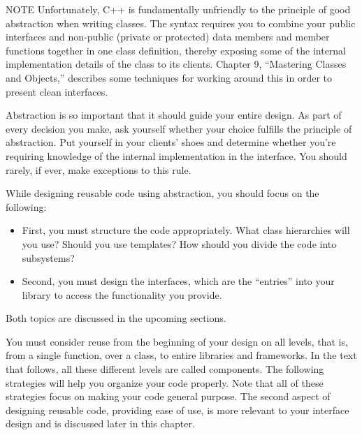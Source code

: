 \begin{myNotic}{NOTE}
Unfortunately, C++ is fundamentally unfriendly to the principle of good abstraction when writing classes. The syntax requires you to combine your public interfaces and non-public (private or protected) data members and member functions together in one class definition, thereby exposing some of the internal implementation details of the class to its clients. Chapter 9, “Mastering Classes and Objects,” describes some techniques for working around this in order to present clean interfaces.
\end{myNotic}

Abstraction is so important that it should guide your entire design. As part of every decision you make, ask yourself whether your choice fulfills the principle of abstraction. Put yourself in your clients’ shoes and determine whether you’re requiring knowledge of the internal implementation in the interface. You should rarely, if ever, make exceptions to this rule.

While designing reusable code using abstraction, you should focus on the following:

\begin{itemize}
\item
First, you must structure the code appropriately. What class hierarchies will you use? Should you use templates? How should you divide the code into subsystems?

\item
Second, you must design the interfaces, which are the “entries” into your library to access the functionality you provide.
\end{itemize}

Both topics are discussed in the upcoming sections.


You must consider reuse from the beginning of your design on all levels, that is, from a single function, over a class, to entire libraries and frameworks. In the text that follows, all these different levels are called components. The following strategies will help you organize your code properly. Note that all of these strategies focus on making your code general purpose. The second aspect of designing reusable code, providing ease of use, is more relevant to your interface design and is discussed later in this chapter.


